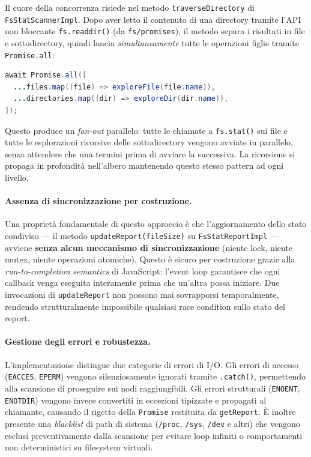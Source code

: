 \documentclass[11pt,a4paper]{article}
\begin{document}
Il cuore della concorrenza risiede nel metodo \texttt{traverseDirectory} di \texttt{FsStatScannerImpl}. Dopo aver letto il contenuto di una directory tramite l'API non bloccante \texttt{fs.readdir()} (da \texttt{fs/promises}), il metodo separa i risultati in file e sottodirectory, quindi lancia \textit{simultaneamente} tutte le operazioni figlie tramite \texttt{Promise.all}:

\begin{lstlisting}[language=Java]
await Promise.all([
  ...files.map((file) => exploreFile(file.name)),
  ...directories.map((dir) => exploreDir(dir.name)),
]);
\end{lstlisting}

Questo produce un \textit{fan-out} parallelo: tutte le chiamate a \texttt{fs.stat()} sui file e tutte le esplorazioni ricorsive delle sottodirectory vengono avviate in parallelo, senza attendere che una termini prima di avviare la successiva. La ricorsione si propaga in profondità nell'albero mantenendo questo stesso pattern ad ogni livello.

\paragraph{Assenza di sincronizzazione per costruzione.}

Una proprietà fondamentale di questo approccio è che l'aggiornamento dello stato condiviso — il metodo \texttt{updateReport(fileSize)} su \texttt{FsStatReportImpl} — avviene \textbf{senza alcun meccanismo di sincronizzazione} (niente lock, niente mutex, niente operazioni atomiche). Questo è sicuro per costruzione grazie alla \textit{run-to-completion semantics} di JavaScript: l'event loop garantisce che ogni callback venga eseguita interamente prima che un'altra possa iniziare. Due invocazioni di \texttt{updateReport} non possono mai sovrapporsi temporalmente, rendendo strutturalmente impossibile qualsiasi race condition sullo stato del report.

\paragraph{Gestione degli errori e robustezza.}

L'implementazione distingue due categorie di errori di I/O. Gli errori di accesso (\texttt{EACCES}, \texttt{EPERM}) vengono silenziosamente ignorati tramite \texttt{.catch()}, permettendo alla scansione di proseguire sui nodi raggiungibili. Gli errori strutturali (\texttt{ENOENT}, \texttt{ENOTDIR}) vengono invece convertiti in eccezioni tipizzate e propagati al chiamante, causando il rigetto della \texttt{Promise} restituita da \texttt{getReport}. È inoltre presente una \textit{blacklist} di path di sistema (\texttt{/proc}, \texttt{/sys}, \texttt{/dev} e altri) che vengono esclusi preventivamente dalla scansione per evitare loop infiniti o comportamenti non deterministici su filesystem virtuali.
\end{document}

